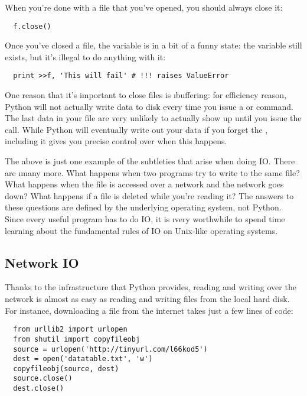 \documentclass[letterpaper, 12pt, titlepage, twoside]{article}
\begin{document}
When you're done with a file that you've opened, you should always close it:

\begin{lstlisting}
  f.close()
\end{lstlisting}

Once you've closed a file, the  variable is in a bit of a funny state:
the variable still exists, but it's illegal to do anything with it:

\begin{lstlisting}
  print >>f, 'This will fail' # !!! raises ValueError
\end{lstlisting}

One reason that it's important to close files is \i{buffering}: for efficiency
reason, Python will not actually write data to disk every time you issue a
 or  command. The last data in your file are very unlikely
to actually show up until you issue the  call. While Python will
eventually write out your data if you forget the , including it
gives you precise control over when this happens.

The above is just one example of the subtleties that arise when doing IO.
There are \i{many} more. What happens when two programs try to write to the
same file? What happens when the file is accessed over a network and the
network goes down? What happens if a file is deleted while you're reading it?
The answers to these questions are defined by the underlying operating system,
not Python. Since every useful program has to do IO, it is \i{very} worthwhile
to spend time learning about the fundamental rules of IO on Unix-like
operating systems.

\subsection*{Network IO}

Thanks to the infrastructure that Python provides, reading and writing over
the network is almost as easy as reading and writing files from the local hard
disk. For instance, downloading a file from the internet takes just a few
lines of code:

\begin{lstlisting}
  from urllib2 import urlopen
  from shutil import copyfileobj
  source = urlopen('http://tinyurl.com/l66kod5')
  dest = open('datatable.txt', 'w')
  copyfileobj(source, dest)
  source.close()
  dest.close()
\end{lstlisting}
\end{document}
